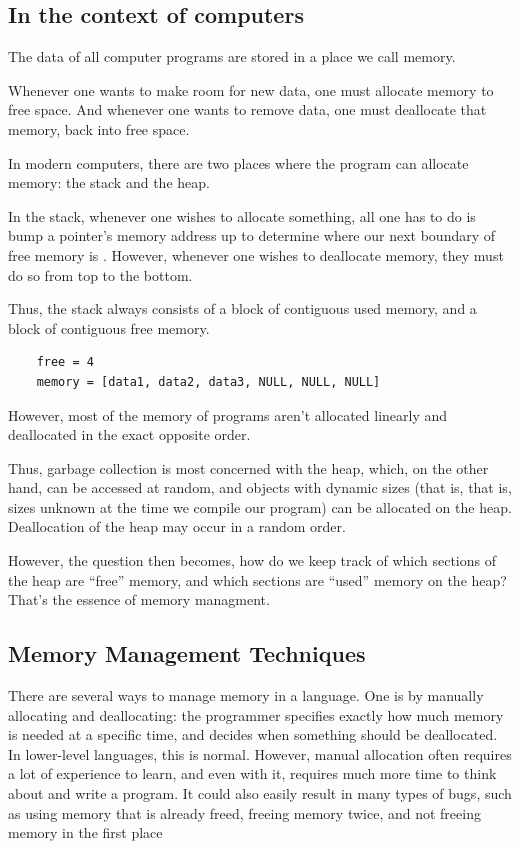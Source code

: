 \documentclass[index]{subfiles}
\begin{document}
\subsection{In the context of computers}

The data of all computer programs are stored in a place we call memory.

Whenever one wants to make room for new data, one must allocate memory to free space. And whenever one wants to remove data, one must deallocate that memory, back into free space.

In modern computers, there are two places where the program can allocate memory: the stack and the heap.

In the stack, whenever one wishes to allocate something, all one has to do is bump a pointer's memory address up to determine where our next boundary of free memory is \cite{the_rust_programming_language}. However, whenever one wishes to deallocate memory, they must do so from top to the bottom.

Thus, the stack always consists of a block of contiguous used memory, and a block of contiguous free memory.

\begin{verbatim}
    free = 4
    memory = [data1, data2, data3, NULL, NULL, NULL]
\end{verbatim}

However, most of the memory of programs aren't allocated linearly and deallocated in the exact opposite order.

Thus, garbage collection is most concerned with the heap, which, on the other hand, can be accessed at random, and objects with dynamic sizes (that is, that is, sizes unknown at the time we compile our program) can be allocated on the heap. Deallocation of the heap may occur in a random order.

However, the question then becomes, how do we keep track of which sections of the heap are ``free'' memory, and which sections are ``used'' memory on the heap? That's the essence of memory managment.

\subsection{Memory Management Techniques}

There are several ways to manage memory in a language. One is by manually allocating and deallocating: the programmer specifies exactly how much memory is needed at a specific time, and decides when something should be deallocated. In lower-level languages, this is normal. However, manual allocation often requires a lot of experience to learn, and even with it, requires much more time to think about and write a program. It could also easily result in many types of bugs, such as using memory that is already freed, freeing memory twice, and not freeing memory in the first place \cites{garbage_collection_overview_uw}[Chapter~1]{gc_handbook}
\end{document}
